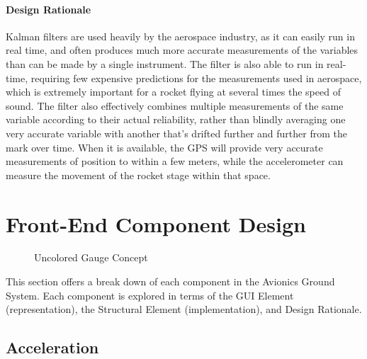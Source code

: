 \documentclass[journal,10pt,onecolumn,compsoc]{IEEEtran}
\begin{document}
			\paragraph{Design Rationale}
				\noindent Kalman filters are used heavily by the aerospace industry, as it can easily run in real time, and often produces much more accurate measurements of the variables than can be made by a single instrument.
				The filter is also able to run in real-time, requiring few expensive predictions for the measurements used in aerospace, which is extremely important for a rocket flying at several times the speed of sound.
				The filter also effectively combines multiple measurements of the same variable according to their actual reliability, rather than blindly averaging one very accurate variable with another that's drifted further and further from the mark over time.
				When it is available, the GPS will provide very accurate measurements of position to within a few meters, while the accelerometer can measure the movement of the rocket stage within that space.
				
		\setlength\parindent{24pt}

\section{Front-End Component Design}

\begin{figure}[H]
\centering
{}
\caption{Uncolored Gauge Concept}
\end{figure}

	\noindent This section offers a break down of each component in the Avionics Ground System.
	Each component is explored in terms of the GUI Element (representation), the Structural Element (implementation), and Design Rationale.

	\subsection{Acceleration}
\end{document}
